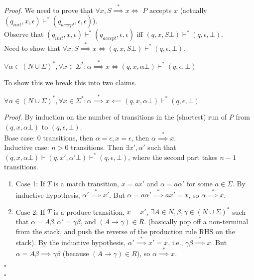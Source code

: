 \documentclass[a4paper]{article}
\newenvironment{proof}{\begin{breakbox}\textit{Proof.}}{\hfill$\square$\end{breakbox}}
\newcommand{\nl}{\vspace{0.2cm}\\}
\newcommand{\derives}{\stackrel{*}{\implies}}
\newcommand{\changesto}{\vdash}
\begin{document}
\begin{proof}
    We need to prove that $\forall x, S \derives x \iff $ $P$ accepts $x$ (actually $(q_{init}, x, \epsilon) \changesto^* (q_{accept}, \epsilon, \epsilon)$).\nl
        Observe that $(q_{init}, x, \epsilon) \changesto^* (q_{accept}, \epsilon, \epsilon)$ iff $(q, x, S\bot) \changesto^* (q, \epsilon, \bot)$.\nl
        Need to show that $\forall x : S \derives x \iff (q, x, S\bot) \changesto^* (q, \epsilon, \bot)$.\nl
    \begin{claim}
        $\forall \alpha \in (N \cup \Sigma)^*, \forall x \in \Sigma^* : \alpha \derives x \iff (q, x, \alpha\bot) \changesto^* (q, \epsilon, \bot)$
    \end{claim}
    To show this we break this into two claims.\nl
    \begin{claim}
        $\forall \alpha \in (N \cup \Sigma)^*, \forall x \in \Sigma^* : \alpha \derives x \impliedby (q, x, \alpha\bot) \changesto^* (q, \epsilon, \bot)$
    \end{claim}
    \begin{proof}
        By induction on the number of transitions in the (shortest) run of $P$ from $(q, x, \alpha\bot)$ to $(q, \epsilon, \bot)$.\nl
        Base case: $0$ transitions, then $\alpha = \epsilon, x = \epsilon$, then $\alpha \derives x$.\nl
        Inductive case: $n > 0$ transitions. Then $\exists x', \alpha'$ such that $(q, x, \alpha\bot) \changesto (q, x', \alpha'\bot) \changesto^* (q, \epsilon, \bot)$, where the second
        part takes $n - 1$ transitions.
        \begin{enumerate}
            \item Case 1: If $T$ is a match transition, $x = ax'$ and $\alpha = a \alpha'$ for some $a \in \Sigma$. By inductive hypothesis, $\alpha' \derives x'$. But $\alpha = a \alpha' \derives
                ax' = x$, so $\alpha \derives x$.
            \item Case 2: If $T$ is a produce transition, $x = x'$, $\exists A \in N, \beta, \gamma \in (N \cup \Sigma)^*$ such that $\alpha = A\beta, \alpha' = \gamma \beta$, and $(A \to \gamma)
                \in R$. (basically pop off a non-terminal from the stack, and push the reverse of the production rule RHS on the stack). By the inductive hypothesis, $\alpha' \derives x' = x$,
                i.e., $\gamma \beta \derives x$. But $\alpha = A \beta \implies \gamma \beta$ (because $(A \to \gamma) \in R$), so $\alpha \derives x$.
        \end{enumerate}
    \end{proof}
    \begin{claim}

\end{claim}
\end{proof}
\end{document}
